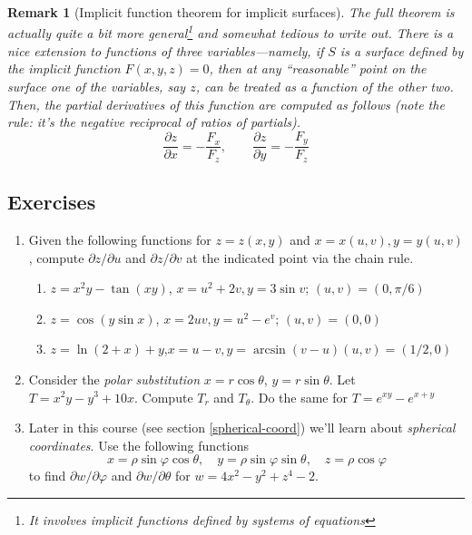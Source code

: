 \documentclass[12pt]{article}
\numberwithin{equation}{subsection}
\numberwithin{figure}{subsection}
\theoremstyle{note}
\newtheorem{remark}[subsection]{Remark}
\begin{document}
{\begin{remark}[Implicit function theorem for implicit surfaces] The full theorem is actually quite a bit more general\footnote{It involves implicit functions defined by \textit{systems} of equations} and somewhat tedious to write out. There is a nice extension to functions of three variables---namely, if $S$ is a surface defined by the implicit function $F(x,y,z)=0$, then at any ``reasonable'' point on the surface one of the variables, say $z$, can be treated as a function of the other two. Then, the partial derivatives of this function are computed as follows (note the rule: it's the negative reciprocal of ratios of partials).  \[ \dfrac{\partial z}{\partial x}=-\dfrac{F_x}{F_z}, \qquad \dfrac{\partial z}{\partial y} = -\dfrac{F_y}{F_z} \]
\end{remark} 
\subsection{Exercises} \label{ch-rule-ex}
\begin{enumerate}[label=\arabic*.]

\item Given the following functions for $z=z(x,y)$ and $x=x(u,v), y=y(u,v)$, compute $\partial z/\partial u$ and $\partial z/\partial v$ at the indicated point via the chain rule. 

\begin{enumerate}
	\item $z=x^2y-\tan (xy)$, \quad $x=u^2+2v, y=3\sin v$; \quad $(u,v)=(0,\pi/6)$
	\item $z=\cos (y\sin x)$, \quad $x=2uv, y=u^2-e^{v}$; \quad $(u,v)=(0,0)$
	\item $z=\ln(2+x)+y$,\quad $x=u-v, y=\arcsin(v-u)$\quad $(u,v)=(1/2,0)$
\end{enumerate}

\item Consider the \textit{polar substitution} $x=r\cos \theta$, $y=r\sin \theta$. Let $T=x^2y-y^3+10x$. Compute $T_r$ and $T_{\theta}$. Do the same for $T=e^{xy}-e^{x+y}$

\item Later in this course (see section \ref{spherical-coord}) we'll learn about \textit{spherical coordinates}. Use the following functions \[x=\rho \sin \varphi \cos \theta, \quad y=\rho \sin \varphi \sin \theta, \quad z=\rho \cos \varphi\] to find $\partial w/\partial \varphi$ and $\partial w/\partial \theta$ for $w=4x^2-y^2+z^4-2$.



\end{enumerate}}
\end{document}
